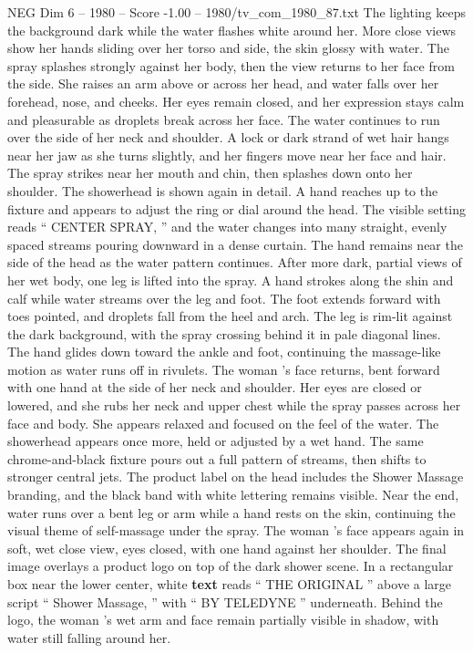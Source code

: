 \begin{textsample}{NEG Dim 6 – 1980 – Score -1.00 – 1980/tv\_com\_1980\_87.txt}
The lighting keeps the background dark while the water flashes white around her.
More close views show her hands sliding over her torso and side, the skin glossy with water.
The spray splashes strongly against her body, then the view returns to her face from the side.
She raises an arm above or across her head, and water falls over her forehead, nose, and cheeks.
Her eyes remain closed, and her expression stays calm and pleasurable as droplets break across her face.
The water continues to run over the side of her neck and shoulder.
A lock or dark strand of wet hair hangs near her jaw as she turns slightly, and her fingers move near her face and hair.
The spray strikes near her mouth and chin, then splashes down onto her shoulder.
The showerhead is shown again in detail.
A hand reaches up to the fixture and appears to adjust the ring or dial around the head.
The visible setting reads “ CENTER SPRAY, ” and the water changes into many straight, evenly spaced streams pouring downward in a dense curtain.
The hand remains near the side of the head as the water pattern continues.
After more dark, partial views of her wet body, one leg is lifted into the spray.
A hand strokes along the shin and calf while water streams over the leg and foot.
The foot extends forward with toes pointed, and droplets fall from the heel and arch.
The leg is rim-lit against the dark background, with the spray crossing behind it in pale diagonal lines.
The hand glides down toward the ankle and foot, continuing the massage-like motion as water runs off in rivulets.
The woman ’s face returns, bent forward with one hand at the side of her neck and shoulder.
Her eyes are closed or lowered, and she rubs her neck and upper chest while the spray passes across her face and body.
She appears relaxed and focused on the feel of the water.
The showerhead appears once more, held or adjusted by a wet hand.
The same chrome-and-black fixture pours out a full pattern of streams, then shifts to stronger central jets.
The product label on the head includes the Shower Massage branding, and the black band with white lettering remains visible.
Near the end, water runs over a bent leg or arm while a hand rests on the skin, continuing the visual theme of self-massage under the spray.
The woman ’s face appears again in soft, wet close view, eyes closed, with one hand against her shoulder.
The final image overlays a product logo on top of the dark shower scene.
In a rectangular box near the lower center, white \textbf{text} reads “ THE ORIGINAL ” above a large script “ Shower Massage, ” with “ BY TELEDYNE ” underneath.
Behind the logo, the woman ’s wet arm and face remain partially visible in shadow, with water still falling around her.

\end{textsample}
